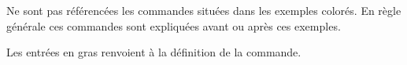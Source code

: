 Ne sont pas référencées les commandes situées dans les exemples colorés. En règle générale ces commandes sont expliquées avant ou après ces exemples.

Les entrées en gras renvoient à la définition de la commande.